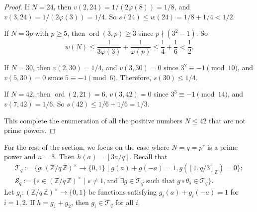 \documentclass{amsart}[11pt]
\theoremstyle{definition}
\numberwithin{equation}{section}
\theoremstyle{notitle}
\begin{document}
\begin{proof}
If $N=24$, then $v(2, 24)=1/(2\varphi(8))=1/8$, and $v(3,
24)=1/(2\varphi(3))=1/4$. So $s(24)\leq w(24)=1/8+1/4<1/2$. 

If $N=3p$ with $p\geq 5$, then $\operatorname{ord}(3,p)\geq 3$ since $p\nmid
(3^2-1)$. So 
\[ w(N)\leq \frac{1}{3\varphi(3)}+\frac{1}{\varphi(p)}\leq
\frac{1}{4}+\frac{1}{6}<\frac{1}{2}.\]

If $N=30$, then $v(2, 30)=1/4$, and $v(3,30)=0$ since $3^2\equiv -1
\pmod{10}$, and $v(5,30)=0$ since $5\equiv -1 \pmod{6}$. Therefore, 
$s(30)\leq 1/4$. 

If $N=42$, then $\operatorname{ord}(2,21)=6$, $v(3, 42)=0$ since $3^3\equiv -1
\pmod{14}$, and $v(7, 42)=1/6$. So $s(42)\leq 1/6+1/6 = 1/3$. 

This complete the enumeration of all the positive numbers $N\leq 42$
that are not prime powers.
\end{proof}

For the rest of the section, we focus on the case where $N=q=p^r$ is a
prime power and $n=3$. Then $h(a)={\left\lfloor {3a/q} \right\rfloor}$.  Recall that
\begin{gather*}
    {\mathscr{T}}_q:=\{g: {(\mathbb{Z}/ {q}\, \mathbb{Z})^\times}\to \{0, 1\}\mid g(a)+g(-a)=1,  g([1, q/3]_{\mathbb{Z}})=0 \};\\
 {\mathscr{S}}_q:=\{s\in {(\mathbb{Z}/ {q}\, \mathbb{Z})^\times} \mid s\neq 1, \text{and } \exists g\in
  {\mathscr{T}}_q \text{ such that } g\circ \theta_s\in {\mathscr{T}}_q\}.     
\end{gather*}
Let $g_i: {(\mathbb{Z}/ {q}\, \mathbb{Z})^\times}\to \{0, 1\}$ be functions satisfying
$g_i(a)+g_i(-a)=1$ for $i=1,2$. If $h=g_1+g_2$, then $g_i\in {\mathscr{T}}_q$
for all $i$.
\end{document}
